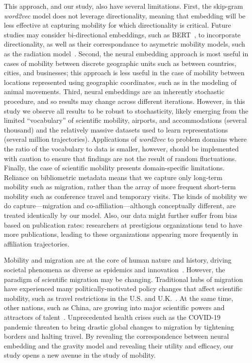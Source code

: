 \documentclass[12pt]{article} %
\begin{document}
This approach, and our study, also have several limitations.
First, the skip-gram \textit{word2vec} model does not leverage directionality, meaning that embedding will be less effective at capturing mobility for which directionality is critical.
Future studies may consider bi-directional embeddings, such as BERT~\autocite{devlin2018bert}, to incorporate directionality, as well as their correspondance to asymetric mobility models, such as the radiation model~\cite{simini2012universal}.
Second, the neural embedding approach is most useful in cases of mobility between discrete geographic units such as between countries, cities, and businesses; this approach is less useful in the case of mobility between locations represented using geographic coordinates, such as in the modeling of animal movements.
Third, neural embeddings are an inherently stochastic procedure, and so results may change across different iterations.
However, in this study we observe all results to be robust to stochasticity, likely emerging from the limited ``vocabulary'' of scientific mobility, airports, and accommodations (several thousand) and the relatively massive datasets used to learn representations (several million trajectories).
Applications of \textit{word2vec} to problem domains where the ratio of the vocabulary to data is smaller, however, should be implemented with caution to ensure that findings are not the result of random fluctuations.
Finally, the case of scientific mobility presents domain-specific limitations.
Reliance on bibliometric metadata means that we capture only long-term mobility such as migration, rather than the array of more frequent short-term mobility such as conference travel and temporary visits.
The kinds of mobility we do capture---migration and co-affiliation---although conceptually different, are treated identically by our model.
Also, our data might further suffer from bias based on publication rates: researchers at prestigious organizations tend to have more publications, leading to these organizations appearing more frequently in affiliation trajectories.


Mobility and migration are at the core of human nature and history, driving societal phenomena as diverse as epidemics\autocite{kraemer2020covid, truscott2012epidemicgravity} and innovation~\autocite{kaiser2018innovation, sugimoto2017mostimpact, petersen2018multiscale, morgan2018prestige, rodrigues2016mobility}.
However, the paradigm of scientific migration may be changing.
Traditional hubs of migration have experienced many politically-motivated policy changes that affect scientific mobility, such as travel restrictions in the U.S. and U.K.~\autocite{chinchilla2018travelban}.
At the same time, other nations, such as China, are growing into major scientific powers and attractors of talent~\autocite{cao2020returning}.
Unprecedented health crises such as the COVID-19 pandemic threaten to bring drastic global changes to migration by tightening borders and halting travel.
By revealing the correspondence between neural embedding and the gravity model and revealing their utility and efficacy, our study opens a new avenue in the study of mobility.
\end{document}
